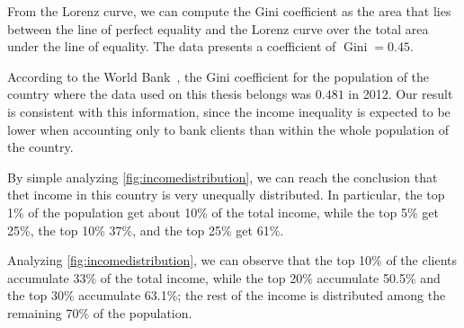 From the Lorenz curve, we can compute the Gini coefficient as the area that lies between the line of perfect equality and the Lorenz curve over the total area under the line of equality. The data presents a coefficient of $\operatorname{Gini} = 0.45$.

According to the World Bank~\cite{world_bank}, the Gini coefficient for the population of the country where the data used on this thesis belongs was $0.481$ in 2012. Our result is consistent with this information, since the income inequality is expected to be lower when accounting only to bank clients than within the whole population of the country.

By simple analyzing \cref{fig:incomedistribution}, we can reach the conclusion that thet income in this country is very unequally distributed. In particular, the top 1\% of the population get about 10\% of the total income, while the top 5\% get 25\%, the top 10\% 37\%, and the top 25\% get 61\%.

Analyzing \cref{fig:incomedistribution}, we can observe that the top 10\% of the clients accumulate 33\% of the total income, while the top 20\% accumulate 50.5\% and the top 30\% accumulate 63.1\%; the rest of the income is distributed among the remaining 70\% of the population.
